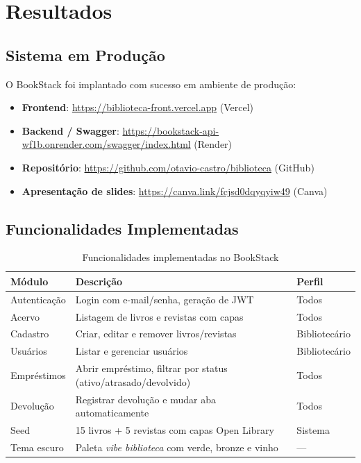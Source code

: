 \documentclass[
  12pt,
  a4paper,
  oneside,
  brazil
]{abntex2}
\begin{document}
\chapter{Resultados}
\label{cap:resultados}

\section{Sistema em Produção}

O BookStack foi implantado com sucesso em ambiente de produção:

\begin{itemize}
  \item \textbf{Frontend}: \url{https://biblioteca-front.vercel.app} (Vercel)
  \item \textbf{Backend / Swagger}: \url{https://bookstack-api-wf1b.onrender.com/swagger/index.html} (Render)
  \item \textbf{Repositório}: \url{https://github.com/otavio-castro/biblioteca} (GitHub)
  \item \textbf{Apresentação de slides}: \url{https://canva.link/fcjsd0dqyqyiw49} (Canva)
\end{itemize}

\section{Funcionalidades Implementadas}

\begin{table}[H]
\centering
\caption{Funcionalidades implementadas no BookStack}
\label{tab:funcionalidades}
\begin{tabularx}{\textwidth}{l L l}
\toprule
\textbf{Módulo} & \textbf{Descrição} & \textbf{Perfil} \\
\midrule
Autenticação   & Login com e-mail/senha, geração de JWT & Todos \\
Acervo         & Listagem de livros e revistas com capas & Todos \\
Cadastro       & Criar, editar e remover livros/revistas & Bibliotecário \\
Usuários       & Listar e gerenciar usuários & Bibliotecário \\
Empréstimos    & Abrir empréstimo, filtrar por status (ativo/atrasado/devolvido) & Todos \\
Devolução      & Registrar devolução e mudar aba automaticamente & Todos \\
Seed           & 15 livros + 5 revistas com capas Open Library & Sistema \\
Tema escuro    & Paleta \textit{vibe biblioteca} com verde, bronze e vinho & --- \\
\bottomrule
\end{tabularx}
\end{table}
\end{document}
